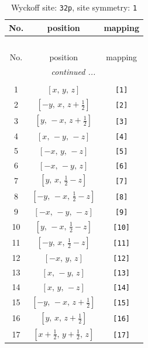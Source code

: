 \documentclass[fleqn,8pt]{jsarticle}
\begin{document}
\renewcommand{\arraystretch}{1.2}
\begin{longtable}{ccc}
\caption{Wyckoff site: {\tt 32p}, site symmetry: {\tt 1}}
 \\
 \hline \hline
No. & position & mapping \\ \hline \endfirsthead

\multicolumn{2}{l}{\tablename\ \thetable{}} \\
 \hline \hline
No. & position & mapping \\ \hline \endhead

 \hline \hline
\multicolumn{2}{r}{\footnotesize\it continued ...} \\ \endfoot

 \hline \hline
\multicolumn{2}{r}{} \\ \endlastfoot

1 & $\left[ x,\, y,\, z \right]$ & {\tt [1]} \\ \hline
2 & $\left[ - y,\, x,\, z + \frac{1}{2} \right]$ & {\tt [2]} \\ \hline
3 & $\left[ y,\, - x,\, z + \frac{1}{2} \right]$ & {\tt [3]} \\ \hline
4 & $\left[ x,\, - y,\, - z \right]$ & {\tt [4]} \\ \hline
5 & $\left[ - x,\, y,\, - z \right]$ & {\tt [5]} \\ \hline
6 & $\left[ - x,\, - y,\, z \right]$ & {\tt [6]} \\ \hline
7 & $\left[ y,\, x,\, \frac{1}{2} - z \right]$ & {\tt [7]} \\ \hline
8 & $\left[ - y,\, - x,\, \frac{1}{2} - z \right]$ & {\tt [8]} \\ \hline
9 & $\left[ - x,\, - y,\, - z \right]$ & {\tt [9]} \\ \hline
10 & $\left[ y,\, - x,\, \frac{1}{2} - z \right]$ & {\tt [10]} \\ \hline
11 & $\left[ - y,\, x,\, \frac{1}{2} - z \right]$ & {\tt [11]} \\ \hline
12 & $\left[ - x,\, y,\, z \right]$ & {\tt [12]} \\ \hline
13 & $\left[ x,\, - y,\, z \right]$ & {\tt [13]} \\ \hline
14 & $\left[ x,\, y,\, - z \right]$ & {\tt [14]} \\ \hline
15 & $\left[ - y,\, - x,\, z + \frac{1}{2} \right]$ & {\tt [15]} \\ \hline
16 & $\left[ y,\, x,\, z + \frac{1}{2} \right]$ & {\tt [16]} \\ \hline
17 & $\left[ x + \frac{1}{2},\, y + \frac{1}{2},\, z \right]$ & {\tt [17]} \\ \hline

\end{longtable}
\end{document}
